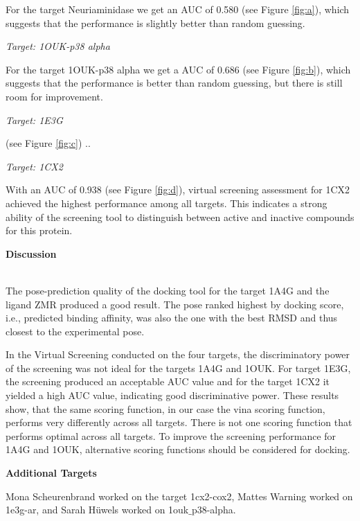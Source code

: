 \documentclass[a4paper,10pt]{article}
\begin{document}
For the target Neuriaminidase we get an AUC of 0.580 (see Figure \ref{fig:a}), which suggests that the performance is slightly better than random guessing. 



\textit{Target: 1OUK-p38 alpha}


For the target 1OUK-p38 alpha we get a AUC of 0.686 (see Figure \ref{fig:b}), which suggests that the performance is better than random guessing, but there is still room for improvement.

\textit{Target: 1E3G}

(see Figure \ref{fig:c})
..

\textit{Target: 1CX2}

With an AUC of 0.938 (see Figure \ref{fig:d}), virtual screening assessment for 1CX2 achieved the highest performance among all targets. This indicates a strong ability of the screening tool to distinguish between active and inactive compounds for this protein.




\begin{large}
	\vspace{0.5cm}
	\textbf{Discussion}
\end{large}	\\ [1mm]

The pose-prediction quality of the docking tool for the target 1A4G and the ligand ZMR produced a good result. The pose ranked highest by docking score, i.e., predicted binding affinity, was also  the one with the best RMSD and thus closest to the experimental pose. 

In the Virtual Screening conducted on the four targets, the discriminatory power of the screening was not ideal for the targets 1A4G and 1OUK. For target 1E3G, the screening produced an acceptable AUC value and for the target 1CX2 it yielded a high AUC value, indicating good discriminative power. These results show, that the same scoring function, in our case the vina scoring function, performs very differently across all targets. There is not one scoring function that performs optimal across all targets. To improve the screening performance for 1A4G and 1OUK, alternative scoring functions should be considered for docking.




\textbf{Additional Targets}

Mona Scheurenbrand worked on the target 1cx2-cox2, Mattes Warning worked on 1e3g-ar, and Sarah Hüwels worked on 1ouk$\_$p38-alpha.



\end{document}
